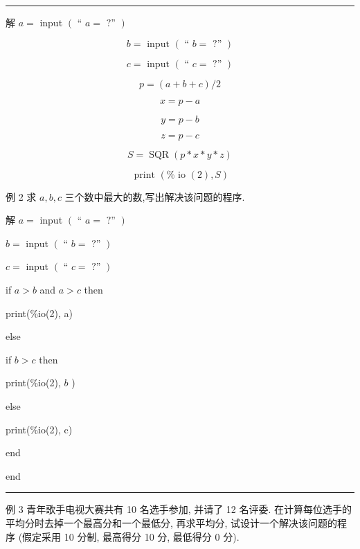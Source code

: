 \documentclass[10pt]{article}
\newcommand{\HRule}{\begin{center}\rule{0.9\linewidth}{0.2mm}\end{center}}
\begin{document}
\HRule

解 \(a =\) input \(\left( {\text{ “ }a = \text{ ?” }}\right)\)

\[
b = \text{ input }\left( {\text{ “ }b = \text{ ?” }}\right)
\]

\[
c = \text{ input }\left( {\text{ “ }c = \text{ ?” }}\right)
\]

\[
p = \left( {a + b + c}\right) /2
\]

\[
x = p - a
\]

\[
y = p - b
\]

\[
z = p - c
\]

\[
S = \operatorname{SQR}\left( {p * x * y * z}\right)
\]

\[
\text{ print }\left( {\% \text{ io }\left( 2\right) ,S}\right)
\]

例 2 求 \(a,b,c\) 三个数中最大的数,写出解决该问题的程序.

解 \(a =\) input \(\left( {\text{ “ }a = \text{ ?” }}\right)\)

\hspace*{1em} \(b =\) input \(\left( {\text{ “ }b = \text{ ?” }}\right)\)

\hspace*{1em} \(c =\) input \(\left( {\text{ “ }c = \text{ ?” }}\right)\)

\hspace*{1em} if \(a > b\) and \(a > c\) then

\hspace*{1em} print(\%io(2), a)

\hspace*{1em} else

\hspace*{1em} if \(b > c\) then

\hspace*{1em} print(\%io(2), \(b\) )

\hspace*{1em} else

\hspace*{1em} print(\%io(2), c)

\hspace*{1em} end

\hspace*{1em} end

\HRule

例 3 青年歌手电视大赛共有 10 名选手参加, 并请了 12 名评委. 在计算每位选手的平均分时去掉一个最高分和一个最低分, 再求平均分, 试设计一个解决该问题的程序 (假定采用 10 分制, 最高得分 10 分, 最低得分 0 分).
\end{document}
